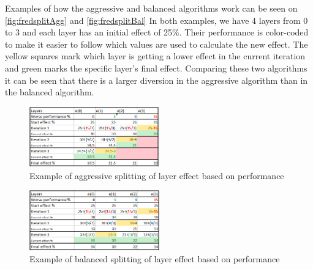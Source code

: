 Examples of how the aggressive and balanced algorithms work can be seen on \autoref{fig:fredsplitAgg} and \autoref{fig:fredsplitBal}
In both examples, we have 4 layers from 0 to 3 and each layer has an initial effect of 25\%.
Their performance is color-coded to make it easier to follow which values are used to calculate the new effect.
The yellow squares mark which layer is getting a lower effect in the current iteration and green marks the specific layer's final effect.
Comparing these two algorithms it can be seen that there is a larger diversion in the aggressive algorithm than in the balanced algorithm.

\begin{figure}
    \includegraphics[width=0.5\textwidth]{figures/fredsplit/aggresiveAlgo.png}
    \centering
    \caption{Example of aggressive splitting of layer effect based on performance}
    \label{fig:fredsplitAgg}
\end{figure}

\begin{figure}
    \includegraphics[width=0.5\textwidth]{figures/fredsplit/balancedAlgo.png}
    \centering
    \caption{Example of balanced splitting of layer effect based on performance}
    \label{fig:fredsplitBal}
\end{figure}


